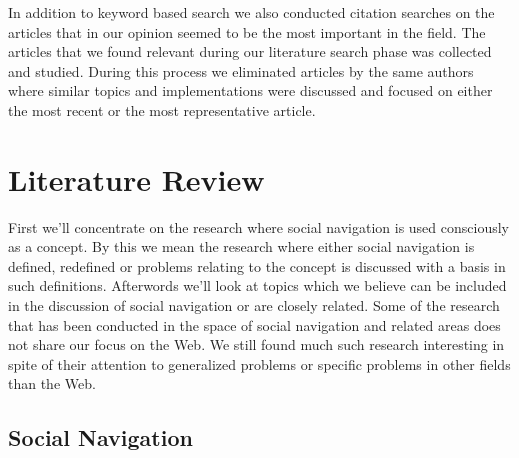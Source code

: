 
In addition to keyword based search we also conducted citation searches on the
articles that in our opinion seemed to be the most important in the field.
The articles that we found relevant during our literature search phase was
collected and studied. During this process we eliminated articles by the same
authors where similar topics and implementations were discussed and focused on
either the most recent or the most representative article.

\section{Literature Review}

First we'll concentrate on the research where social navigation is used
consciously as a concept. By this we mean the research where either social
navigation is defined, redefined or problems relating to the concept is
discussed with a basis in such definitions. Afterwords we'll look at topics
which we believe can be included in the discussion of social navigation or are
closely related. Some of the research that has been conducted in the space of
social navigation and related areas does not share our focus on the Web.
We still found much such research interesting in spite of their attention to
generalized problems or specific problems in other fields than the Web.

\subsection{Social Navigation}
\label{section:background.social.navigation}


